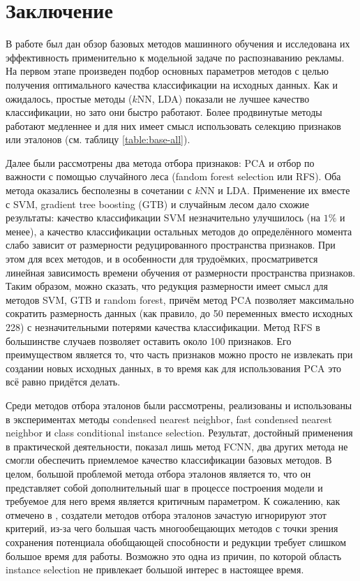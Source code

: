 \section{Заключение}
В работе был дан обзор базовых методов машинного обучения и исследована их эффективность применительно к модельной задаче по распознаванию рекламы. На первом этапе произведен подбор основных параметров методов с целью получения оптимального качества классификации на исходных данных. Как и ожидалось, простые методы (\(k\)NN, LDA) показали не лучшее качество классификации, но зато они быстро работают. Более продвинутые методы работают медленнее и для них имеет смысл использовать селекцию признаков или эталонов (см. таблицу \ref{table:base-all}). 
\par
Далее были рассмотрены два метода отбора признаков: PCA и отбор по важности с помощью случайного леса (fandom forest selection или RFS). Оба метода оказались бесполезны в сочетании с \(k\)NN и LDA. Применение их вместе с SVM, gradient tree boosting (GTB) и случайным лесом дало схожие результаты: качество классификации SVM незначительно улучшилось (на \(1\%\) и менее), а качество классификации остальных методов до определённого момента слабо зависит от размерности редуцированного пространства признаков. При этом для всех методов, и в особенности для трудоёмких, просматривется линейная зависимость времени обучения от размерности пространства признаков. Таким образом, можно сказать, что редукция размерности имеет смысл для методов SVM, GTB и random forest, причём метод PCA позволяет максимально сократить размерность данных (как правило, до 50 переменных вместо исходных 228) с незначительными потерями качества классификации. Метод RFS в большинстве случаев позволяет оставить около 100 признаков. Его преимуществом является то, что часть признаков можно просто не извлекать при создании новых исходных данных, в то время как для использования PCA это всё равно придётся делать.

Среди методов отбора эталонов были рассмотрены, реализованы и использованы в экспериментах методы condensed nearest neighbor, fast condensed nearest neighbor и class conditional instance selection. Результат, достойный применения в практической деятельности, показал лишь метод FCNN, два других метода не смогли обеспечить приемлемое качество классификации базовых методов. В целом, большой проблемой метода отбора эталонов является то, что он представляет собой дополнительный шаг в процессе построения модели и требуемое для него время является критичным параметром. К сожалению, как отмечено в \cite{angiulli}, создатели методов отбора эталонов зачастую игнорируют этот критерий, из-за чего большая часть многообещающих методов с точки зрения сохранения потенциала обобщающей способности и редукции требует слишком большое время для работы. Возможно это одна из причин, по которой область instance selection не привлекает большой интерес в настоящее время.

